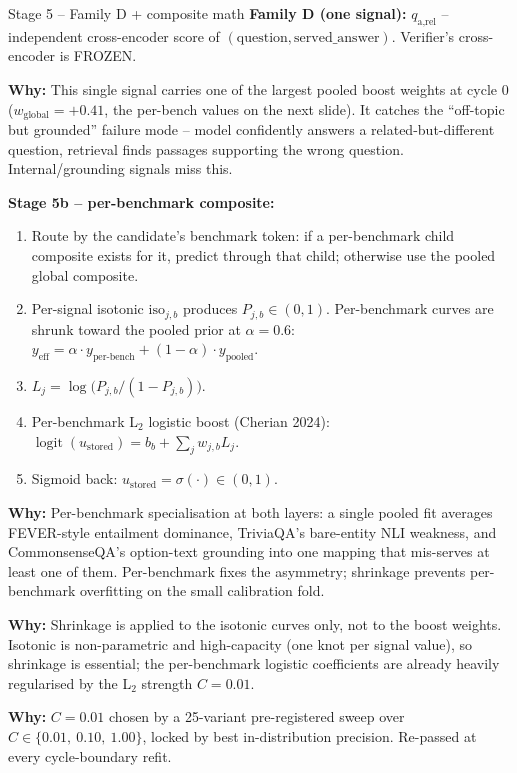 \documentclass[10pt,aspectratio=169]{beamer}
\newcommand{\why}[1]{{\color{caemamber}\textbf{Why:}} #1}
\begin{document}
\begin{frame}{Stage 5 -- Family D + composite math}
  \scriptsize
  \textbf{Family D (one signal):} $q_{\text{a,rel}}$ -- independent cross-encoder score of $(\text{question}, \text{served\_answer})$. Verifier's cross-encoder is FROZEN.

  \why{This single signal carries one of the largest pooled boost weights at cycle 0 ($w_{\text{global}} = +0.41$, the per-bench values on the next slide). It catches the ``off-topic but grounded'' failure mode -- model confidently answers a related-but-different question, retrieval finds passages supporting the wrong question. Internal/grounding signals miss this.}

  \vspace{0.4em}
  \textbf{Stage 5b -- per-benchmark composite:}
  \begin{enumerate}\scriptsize
    \item Route by the candidate's benchmark token: if a per-benchmark child composite exists for it, predict through that child; otherwise use the pooled global composite.
    \item Per-signal isotonic $\mathrm{iso}_{j,b}$ produces $P_{j,b}\in(0,1)$. Per-benchmark curves are shrunk toward the pooled prior at $\alpha{=}0.6$: $y_{\text{eff}} = \alpha \cdot y_{\text{per-bench}} + (1{-}\alpha) \cdot y_{\text{pooled}}$.
    \item $L_j = \log\bigl(P_{j,b}/(1{-}P_{j,b})\bigr)$.
    \item Per-benchmark L$_2$ logistic boost (Cherian 2024): $\operatorname{logit}(u_{\text{stored}}) = b_b + \sum_j w_{j,b} L_j$.
    \item Sigmoid back: $u_{\text{stored}} = \sigma(\cdot) \in (0,1)$.
  \end{enumerate}

  \why{Per-benchmark specialisation at both layers: a single pooled fit averages FEVER-style entailment dominance, TriviaQA's bare-entity NLI weakness, and CommonsenseQA's option-text grounding into one mapping that mis-serves at least one of them. Per-benchmark fixes the asymmetry; shrinkage prevents per-benchmark overfitting on the small calibration fold.}

  \why{Shrinkage is applied to the isotonic curves only, not to the boost weights. Isotonic is non-parametric and high-capacity (one knot per signal value), so shrinkage is essential; the per-benchmark logistic coefficients are already heavily regularised by the L$_2$ strength $C=0.01$.}

  \why{$C = 0.01$ chosen by a 25-variant pre-registered sweep over $C \in \{0.01,\ 0.10,\ 1.00\}$, locked by best in-distribution precision. Re-passed at every cycle-boundary refit.}
\end{frame}
\end{document}
